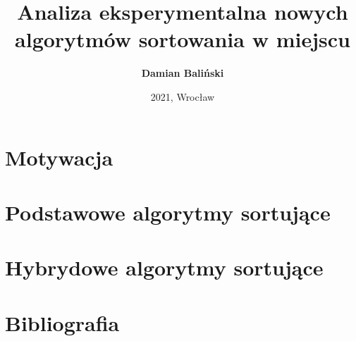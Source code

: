 \documentclass[xcolor=dvipsnames]{beamer}
\title{Analiza eksperymentalna nowych algorytmów sortowania w miejscu}
\author{
	\textbf{Damian Baliński}
}
\date{2021, Wrocław}
\begin{document}
\begin{frame}[plain]{}
	\titlepage
\end{frame}

\section{Motywacja}


\section{Podstawowe algorytmy sortujące}



\section{Hybrydowe algorytmy sortujące}







\section{Bibliografia}

\end{document}
